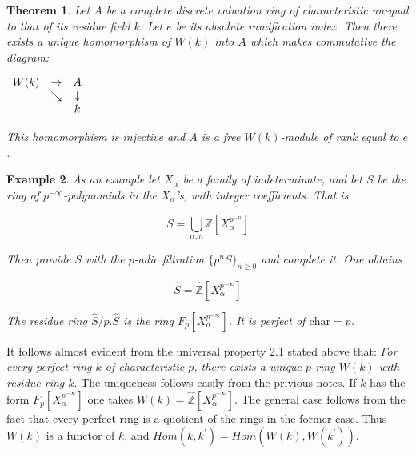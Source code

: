 \documentclass[12pt,twoside]{amsart}
\newtheorem{theorem}{Theorem}[section]
\newtheorem{example}[theorem]{Example}
\begin{document}
\vspace{0.5cm}

\begin{theorem}\cite{SE}
Let $A$ be a complete discrete valuation ring of characteristic unequal to that of its residue field $k$. Let $e$ be its absolute ramification index. Then there exists a unique homomorphism of $W(k)$ into $A$ which makes commutative the diagram:

\vspace{0.5cm}

\begin{center}
$\begin{array}[c]{ccc}
W(k)&\rightarrow&A\\
&\searrow&\downarrow\\
&&k
\end{array}$
\end{center}

\vspace{0.5cm}

\noindent
This homomorphism is injective and $A$ is a free $W(k)$-module of rank equal to $e$. 
\end{theorem}

\vspace{0.5cm}

\begin{example}\cite{SE} As an example let $X_{\alpha}$ be a family of indeterminate, and let $S$ be the ring of $p^{-\infty}$-polynomials in the $X_{\alpha}$'s, with integer coefficients. That is

\[ S=\displaystyle{\bigcup_{\alpha, n} \mathbb{Z}[X_{\alpha}^{p^{-n}}]} \]

\vspace{0.5cm}

\noindent
Then provide $S$ with the $p$-adic filtration $\{ p^nS\}_{n\geq0}$ and complete it. One obtains 

\[ \hat{S}=\hat{\mathbb{Z}}[X_{\alpha}^{p^{-\infty}}] \]

\vspace{0.5cm}

\noindent
The residue ring $\hat{S}/p.\hat{S}$ is the ring $F_p[X_{\alpha}^{p^{-\infty}}]$. It is perfect of $\text{char}=p$.
 
\end{example}

\vspace{0.5cm}

It follows almost evident from the universal property 2.1 stated above that: \textit{For every perfect ring $k$ of characteristic $p$, there exists a unique $p$-ring $W(k)$ with residue ring $k$}. The uniqueness follows easily from the privious notes. If $k$ has the form $F_p[X_{\alpha}^{p^{-\infty}}]$ one takes $W(k)=\hat{\mathbb{Z}}[X_{\alpha}^{p^{-\infty}}]$. The general case follows from the fact that every perfect ring is a quotient of the rings in the former case. Thus $W(k)$ is a functor of $k$, and $Hom(k,k^{\prime})=Hom(W(k),W(k^{\prime}))$.
\end{document}
